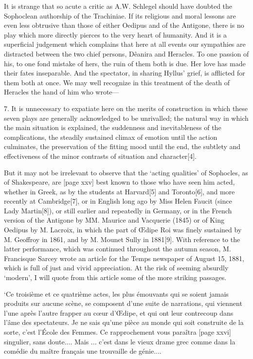 \documentclass[11pt,letter]{book}
\begin{document}
\par  It is strange that so acute a critic as A.W. Schlegel should have doubted the Sophoclean authorship of the Trachiniae. If its religious and moral lessons are even less obtrusive than those of either Oedipus and of the Antigone, there is no play which more directly pierces to the very heart of humanity. And it is a superficial judgement which complains that here at all events our sympathies are distracted between the two chief persons, Dêanira and Heracles. To one passion of his, to one fond mistake of hers, the ruin of them both is due. Her love has made their fates inseparable. And the spectator, in sharing Hyllus’ grief, is afflicted for them both at once. We may well recognize in this treatment of the death of Heracles the hand of him who wrote—
 
\par  7. It is unnecessary to expatiate here on the merits of construction in which these seven plays are generally acknowledged to be unrivalled; the natural way in which the main situation is explained, the suddenness and inevitableness of the complications, the steadily sustained climax of emotion until the action culminates, the preservation of the fitting mood until the end, the subtlety and effectiveness of the minor contrasts of situation and character[4].

\par  But it may not be irrelevant to observe that the ‘acting qualities’ of Sophocles, as of Shakespeare, are [page xxv] best known to those who have seen him acted, whether in Greek, as by the students at Harvard[5] and Toronto[6], and more recently at Cambridge[7], or in English long ago by Miss Helen Faucit (since Lady Martin[8]), or still earlier and repeatedly in Germany, or in the French version of the Antigone by MM. Maurice and Vacquerie (1845) or of King Oedipus by M. Lacroix, in which the part of Œdipe Roi was finely sustained by M. Geoffroy in 1861, and by M. Mounet Sully in 1881[9]. With reference to the latter performance, which was continued throughout the autumn season, M. Francisque Sarcey wrote an article for the Temps newspaper of August 15, 1881, which is full of just and vivid appreciation. At the risk of seeming absurdly ‘modern’, I will quote from this article some of the more striking passages.

\par  ‘Ce troisième et ce quatrième actes, les plus émouvants qui se soient jamais produits sur aucune scène, se composent d’une suite de narrations, qui viennent l’une après l’autre frapper au cœur d’Œdipe, et qui ont leur contrecoup dans l’âme des spectateurs. Je ne sais qu’une pièce au monde qui soit construite de la sorte, c’est l’École des Femmes. Ce rapprochement vous paraîtra [page xxvi] singulier, sans doute.... Mais ... c’est dans le vieux drame grec comme dans la comédie du maître français une trouvaille de génie....
\end{document}

